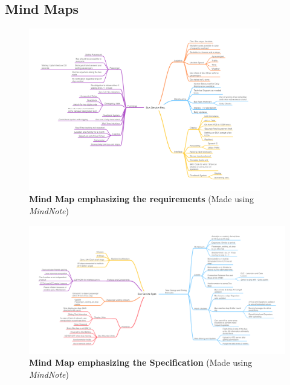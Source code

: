 \pagestyle{uselscape}
\begin{landscapes}
\section{Mind Maps}
\begin{center}
    \begin{figure}[H]
        \centering
        \includegraphics[width=0.9\textwidth,trim={1cm 2cm 0cm 2cm}, clip]{./Files/Images/CoolBUS_Req_Mind_Map.png}
        \caption[\textbf{Mind Map emphasizing the requirements}]{\textbf{Mind Map emphasizing the requirements} (Made using \textit{MindNote})}
    \end{figure}
\end{center}

\begin{center}
    \begin{figure}[H]
        \centering
        \includegraphics[width=1.1\textwidth,trim={1cm 2cm 0cm 2cm}, clip]{./Files/Images/CoolBUS_Spec_Mind_Map.png}
        \caption[\textbf{Mind Map emphasizing the Specification}]{\textbf{Mind Map emphasizing the Specification} (Made using \textit{MindNote})}
    \end{figure}
\end{center}

\end{landscapes}
